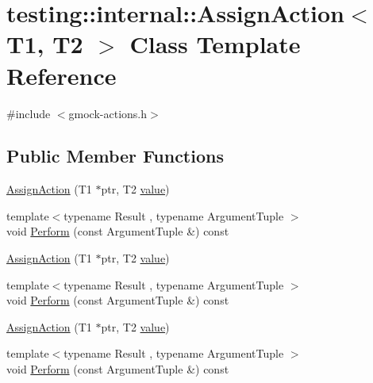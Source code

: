 \hypertarget{classtesting_1_1internal_1_1_assign_action}{}\section{testing\+::internal\+::Assign\+Action$<$ T1, T2 $>$ Class Template Reference}
\label{classtesting_1_1internal_1_1_assign_action}


{\ttfamily \#include $<$gmock-\/actions.\+h$>$}

\subsection*{Public Member Functions}
\begin{DoxyCompactItemize}
\item 
\mbox{\hyperlink{classtesting_1_1internal_1_1_assign_action_ae5a8fe8954ff3f8b26a08b57c3afdf9a}{Assign\+Action}} (T1 $\ast$ptr, T2 \mbox{\hyperlink{_obj__test_2lib_2googletest-master_2googlemock_2test_2gmock-matchers__test_8cc_a337b8a670efc0b086ad3af163f3121b6}{value}})
\item 
{\footnotesize template$<$typename Result , typename Argument\+Tuple $>$ }\\void \mbox{\hyperlink{classtesting_1_1internal_1_1_assign_action_a540912bec1f4de6fc4c7de26312e4586}{Perform}} (const Argument\+Tuple \&) const
\item 
\mbox{\hyperlink{classtesting_1_1internal_1_1_assign_action_ae5a8fe8954ff3f8b26a08b57c3afdf9a}{Assign\+Action}} (T1 $\ast$ptr, T2 \mbox{\hyperlink{_obj__test_2lib_2googletest-master_2googlemock_2test_2gmock-matchers__test_8cc_a337b8a670efc0b086ad3af163f3121b6}{value}})
\item 
{\footnotesize template$<$typename Result , typename Argument\+Tuple $>$ }\\void \mbox{\hyperlink{classtesting_1_1internal_1_1_assign_action_a540912bec1f4de6fc4c7de26312e4586}{Perform}} (const Argument\+Tuple \&) const
\item 
\mbox{\hyperlink{classtesting_1_1internal_1_1_assign_action_ae5a8fe8954ff3f8b26a08b57c3afdf9a}{Assign\+Action}} (T1 $\ast$ptr, T2 \mbox{\hyperlink{_obj__test_2lib_2googletest-master_2googlemock_2test_2gmock-matchers__test_8cc_a337b8a670efc0b086ad3af163f3121b6}{value}})
\item 
{\footnotesize template$<$typename Result , typename Argument\+Tuple $>$ }\\void \mbox{\hyperlink{classtesting_1_1internal_1_1_assign_action_a540912bec1f4de6fc4c7de26312e4586}{Perform}} (const Argument\+Tuple \&) const
\end{DoxyCompactItemize}

